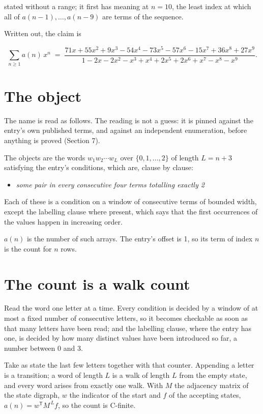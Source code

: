 \documentclass[11pt]{article}
\theoremstyle{definition}
\begin{document}
stated without a range; it first has meaning at $n = 10$, the least index at which all of $a(n-1),\dots,a(n-9)$ are terms of the sequence.

Written out, the claim is

\[\sum_{n \ge 1} a(n)\,x^n \;=\; \frac{71x + 55x^{2} + 9x^{3} - 54x^{4} - 73x^{5} - 57x^{6} - 15x^{7} + 36x^{8} + 27x^{9}}{1 - 2x - 2x^{2} - x^{3} + x^{4} + 2x^{5} + 2x^{6} + x^{7} - x^{8} - x^{9}}.\]

\section{The object}

The name is read as follows. The reading is not a guess: it is pinned against the entry's own published terms, and against an independent enumeration, before anything is proved (Section 7).

The objects are the words $w_1 w_2 \cdots w_L$ over $\{0,1,\dots,2\}$ of length $L = n + 3$ satisfying the entry's conditions, which are, clause by clause:

\begin{itemize}

\item {\itshape some pair in every consecutive four terms totalling exactly 2}

\end{itemize}

Each of these is a condition on a window of consecutive terms of bounded width, except the labelling clause where present, which says that the first occurrences of the values happen in increasing order.

$a(n)$ is the number of such arrays. The entry's offset is 1, so its term of index $n$ is the count for $n$ rows.

\section{The count is a walk count}

Read the word one letter at a time. Every condition is decided by a window of at most a fixed number of consecutive letters, so it becomes checkable as soon as that many letters have been read; and the labelling clause, where the entry has one, is decided by how many distinct values have been introduced so far, a number between $0$ and 3.

Take as state the last few letters together with that counter. Appending a letter is a transition; a word of length $L$ is a walk of length $L$ from the empty state, and every word arises from exactly one walk. With $M$ the adjacency matrix of the state digraph, $w$ the indicator of the start and $f$ of the accepting states, $a(n) = w^{\mathsf T}M^{\,L}f$, so the count is C-finite.
\end{document}
